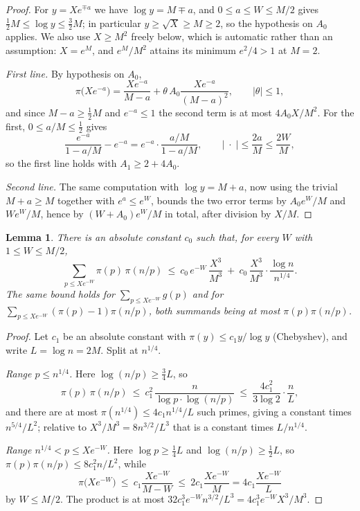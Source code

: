 \documentclass[a4paper,11pt,oneside,reqno]{amsart}
\theoremstyle{definition}
\theoremstyle{remark}
\theoremstyle{plain}
\newtheorem{lemma}[definition]{Lemma}
\begin{document}
\begin{proof}
  For \(y = Xe^{\mp a}\) we have \(\log y = M\mp a\), and \(0 \le a \le W \le M/2\)
  gives \(\tfrac{1}{2}M \le \log y \le \tfrac{3}{2}M\); in particular \(y \ge \sqrt X \ge M \ge 2\),
  so the hypothesis on \(A_0\) applies. We also use \(X \ge M^{2}\) freely below,
  which is automatic rather than an assumption: \(X = e^{M}\), and \(e^{M}/M^{2}\)
  attains its minimum \(e^{2}/4 > 1\) at \(M = 2\).

  \emph{First line.} By hypothesis on \(A_0\),
  \[
    \pi\bigl(Xe^{-a}\bigr)
      =\frac{Xe^{-a}}{M-a}+\theta\,A_0\frac{Xe^{-a}}{(M-a)^{2}},
      \qquad|\theta|\le 1 ,
  \]
  and since \(M-a \ge \tfrac{1}{2}M\) and \(e^{-a} \le 1\) the second term is at most
  \(4A_0X/M^{2}\). For the first, \(0 \le a/M \le \tfrac{1}{2}\) gives
  \[
    \frac{e^{-a}}{1-a/M}-e^{-a} = e^{-a} \cdot \frac{a/M}{1-a/M},
    \qquad\left|\;\cdot \;\right|\le \frac{2a}{M} \le \frac{2W}{M},
  \]
  so the first line holds with \(A_1 \ge 2+4A_0\).

  \emph{Second line.} The same computation with \(\log y = M+a\), now using the
  trivial \(M+a \ge M\) together with \(e^{a} \le e^{W}\), bounds the two error
  terms by \(A_0e^{W}/M\) and \(We^{W}/M\), hence by \((W+A_0)e^{W}/M\) in
  total, after division by \(X/M\).
\end{proof}

\begin{lemma}\label{lem:tail}
  There is an absolute constant \(c_0\) such that, for every \(W\) with
  \(1 \le W \le M/2\),
  \[
    \sum_{p \le Xe^{-W}}\pi(p)\,\pi(n/p)
      \ \le \ c_0\,e^{-W}\,\frac{X^{3}}{M^{3}}
      \ +\ c_0\,\frac{X^{3}}{M^{3}} \cdot \frac{\log n}{n^{1/4}} .
  \]
  The same bound holds for \(\sum_{p \le Xe^{-W}}g(p)\) and for
  \(\sum_{p \le Xe^{-W}}(\pi(p)-1)\pi(n/p)\), both summands being at most
  \(\pi(p)\pi(n/p)\).
\end{lemma}

\begin{proof}
  Let \(c_1\) be an absolute constant with \(\pi(y) \le c_1y/\log y\)
  (Chebyshev), and write \(L = \log n = 2M\). Split at \(n^{1/4}\).

  \emph{Range \(p \le n^{1/4}\).} Here \(\log(n/p) \ge \tfrac{3}{4}L\), so
  \[
    \pi(p)\,\pi(n/p)\ \le \ c_1^{2}\,\frac{n}{\log p \cdot \log(n/p)}
      \ \le \ \frac{4c_1^{2}}{3\log 2} \cdot \frac{n}{L} ,
  \]
  and there are at most \(\pi(n^{1/4}) \le 4c_1n^{1/4}/L\) such primes, giving a
  constant times \(n^{5/4}/L^{2}\); relative to \(X^{3}/M^{3} = 8n^{3/2}/L^{3}\)
  that is a constant times \(L/n^{1/4}\).

  \emph{Range \(n^{1/4} < p \le Xe^{-W}\).} Here \(\log p \ge \tfrac{1}{4}L\) and
  \(\log(n/p) \ge \tfrac{1}{2}L\), so \(\pi(p)\pi(n/p) \le 8c_1^{2}n/L^{2}\), while
  \[
    \pi\bigl(Xe^{-W}\bigr)\ \le \ c_1\frac{Xe^{-W}}{M-W}
      \ \le \ 2c_1\frac{Xe^{-W}}{M} = 4c_1\frac{Xe^{-W}}{L}
  \]
  by \(W \le M/2\). The product is at most
  \(32c_1^{3}e^{-W}n^{3/2}/L^{3} = 4c_1^{3}e^{-W}X^{3}/M^{3}\).
\end{proof}
\end{document}
